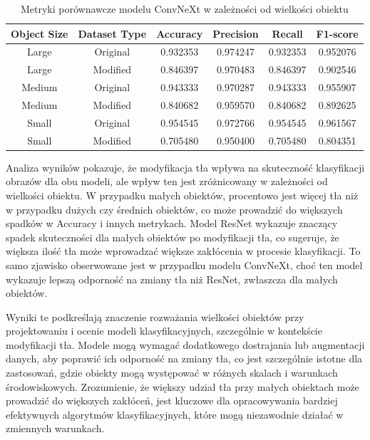 \begin{table}
	\centering
	\begin{tabular}{|c|c|c|c|c|c|}
		\hline
		\textbf{Object Size} & \textbf{Dataset Type} & \textbf{Accuracy} & \textbf{Precision} & \textbf{Recall} & \textbf{F1-score} \\
		\hline
		Large & Original & 0.932353 & 0.974247 & 0.932353 & 0.952076 \\
		\hline
		Large & Modified & 0.846397 & 0.970483 & 0.846397 & 0.902546 \\
		\hline
		Medium & Original & 0.943333 & 0.970287 & 0.943333 & 0.955907 \\
		\hline
		Medium & Modified & 0.840682 & 0.959570 & 0.840682 & 0.892625 \\
		\hline
		Small & Original & 0.954545 & 0.972766 & 0.954545 & 0.961567 \\
		\hline
		Small & Modified & 0.705480 & 0.950400 & 0.705480 & 0.804351 \\
		\hline
	\end{tabular}
	\caption{Metryki porównawcze modelu ConvNeXt w zależności od wielkości obiektu}
	\label{tab:convnext_object_size_metrics}
\end{table}

Analiza wyników pokazuje, że modyfikacja tła wpływa na skuteczność klasyfikacji obrazów dla obu modeli, ale wpływ ten jest zróżnicowany w 
zależności od wielkości obiektu. W przypadku małych obiektów, procentowo jest więcej tła niż w przypadku dużych czy średnich obiektów, co może 
prowadzić do większych spadków w Accuracy i innych metrykach. Model ResNet wykazuje znaczący spadek skuteczności dla małych obiektów po 
modyfikacji tła, co sugeruje, że większa ilość tła może wprowadzać większe zakłócenia w procesie klasyfikacji. To samo zjawisko obserwowane 
jest w przypadku modelu ConvNeXt, choć ten model wykazuje lepszą odporność na zmiany tła niż ResNet, zwłaszcza dla małych obiektów.

Wyniki te podkreślają znaczenie rozważania wielkości obiektów przy projektowaniu i ocenie modeli klasyfikacyjnych, szczególnie w kontekście 
modyfikacji tła. Modele mogą wymagać dodatkowego dostrajania lub augmentacji danych, aby poprawić ich odporność na zmiany tła, co jest 
szczególnie istotne dla zastosowań, gdzie obiekty mogą występować w różnych skalach i warunkach środowiskowych. Zrozumienie, że większy udział 
tła przy małych obiektach może prowadzić do większych zakłóceń, jest kluczowe dla opracowywania bardziej efektywnych algorytmów klasyfikacyjnych, 
które mogą niezawodnie działać w zmiennych warunkach.

